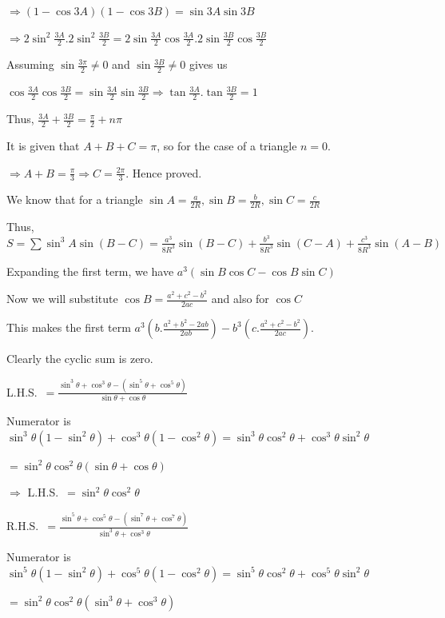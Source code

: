   $\Rightarrow (1 - \cos3A)(1 - \cos3B) = \sin3A\sin3B$

  $\Rightarrow 2\sin^2\frac{3A}{2}.2\sin^2\frac{3B}{2} =
  2\sin\frac{3A}{2}\cos\frac{3A}{2}.2\sin\frac{3B}{2}\cos\frac{3B}{2}$

  Assuming $\sin\frac{3\pi}{2}\neq 0$ and $\sin\frac{3B}{2} \neq 0$ gives us

  $\cos\frac{3A}{2}\cos\frac{3B}{2}
  = \sin\frac{3A}{2}\sin\frac{3B}{2} \Rightarrow \tan\frac{3A}{2}.\tan\frac{3B}{2} = 1$

  Thus, $\frac{3A}{2} + \frac{3B}{2} = \frac{\pi}{2} + n\pi$

  It is given that $A + B + C = \pi$, so for the case of a triangle $n = 0$.

  $\Rightarrow A + B = \frac{\pi}{3}\Rightarrow C = \frac{2\pi}{3}$. Hence proved.
\item We know that for a triangle $\sin A = \frac{a}{2R}, \sin B = \frac{b}{2R}, \sin C = \frac{c}{2R}$

  Thus, $S = \sum \sin^3A\sin(B - C) = \frac{a^3}{8R^3}\sin(B - C) + \frac{b^3}{8R^3}\sin(C - A)
  + \frac{c^3}{8R^3}\sin(A - B)$

  Expanding the first term, we have $a^3\left(\sin B\cos C - \cos B\sin C\right)$

  Now we will substitute $\cos B = \frac{a^2 + c^2 - b^2}{2ac}$ and also for $\cos C$

  This makes the first term $a^3\left(b.\frac{a^2 + b^2 - 2ab}{2ab}\right) - b^3\left(c.\frac{a^2 + c^2 -
    b^2}{2ac}\right)$.

  Clearly the cyclic sum is zero.
\item L.H.S.\ $= \frac{\sin^3\theta + \cos^3\theta - (\sin^5\theta + \cos^5\theta)}{\sin\theta
  + \cos\theta}$

  Numerator is $\sin^3\theta(1 - \sin^2\theta) + \cos^3\theta(1 - \cos^2\theta) = \sin^3\theta\cos^2\theta
  + \cos^3\theta\sin^2\theta$

  $= \sin^2\theta\cos^2\theta(\sin\theta + \cos\theta)$

  $\Rightarrow $ L.H.S.\ $= \sin^2\theta\cos^2\theta$

  R.H.S.\ $= \frac{\sin^5\theta + \cos^5\theta - (\sin^7\theta + \cos^7\theta)}{\sin^3\theta
  + \cos^3\theta}$

  Numerator is $\sin^5\theta(1 - \sin^2\theta) + \cos^5\theta(1 - \cos^2\theta) = \sin^5\theta\cos^2\theta
  + \cos^5\theta\sin^2\theta$

  $= \sin^2\theta\cos^2\theta(\sin^3\theta + \cos^3\theta)$

